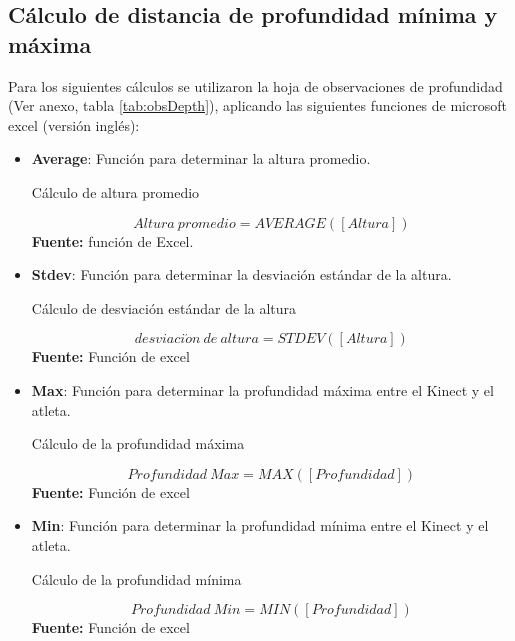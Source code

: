 \subsection{C\'alculo de distancia de profundidad m\'inima y m\'axima} \label{dis:deep}
Para los siguientes c\'alculos se utilizaron la hoja de observaciones de profundidad (Ver anexo, tabla  \ref{tab:obsDepth}), aplicando las siguientes funciones de microsoft excel (versi\'on ingl\'es):
\begin{itemize}
       \item \textbf{Average}: Funci\'on para determinar la altura promedio.
\begin{formula}[H]
	\centering
	\caption{C\'alculo de altura promedio}
	\label{frm:avgHeight}
	\begin{equation}
	Altura \: promedio =AVERAGE([Altura])
	\end{equation}
		\textbf{Fuente:} funci\'on de Excel.
\end{formula}
       \item \textbf{Stdev}: Funci\'on para determinar la desviaci\'on est\'andar de la altura.
\begin{formula}[H]
	\centering
	\caption{C\'alculo de desviaci\'on est\'andar de la altura}
	\label{frm:stdevHeight}
	\begin{equation}
	desviaci\acute{o}n \:  de \: altura =STDEV([Altura])
	\end{equation}
		\textbf{Fuente:} Funci\'on de excel
\end{formula}
       \item \textbf{Max}: Funci\'on para determinar la profundidad m\'axima entre el Kinect y el atleta.
       \begin{formula}[H]
	\centering
	\caption{C\'alculo de la profundidad m\'axima}
	\label{frm:maxDepth}
	\begin{equation}
	Profundidad \: Max =MAX([Profundidad])
	\end{equation}
		\textbf{Fuente:} Funci\'on de excel
\end{formula}
       \item \textbf{Min}: Funci\'on para determinar la profundidad m\'inima entre el Kinect y el atleta.
              \begin{formula}[H]
	\centering
	\caption{C\'alculo de la profundidad m\'inima}
	\label{frm:minDepth}
	\begin{equation}
	Profundidad \:  Min =MIN([Profundidad])
	\end{equation}
		\textbf{Fuente:} Funci\'on de excel
\end{formula}
\end{itemize}
